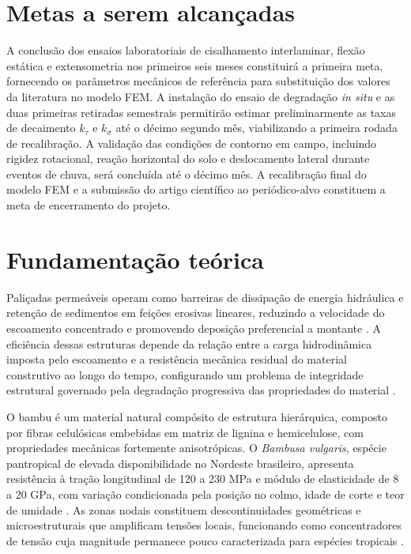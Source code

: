 \documentclass[
  brazilian,
  authoryear,
  preprint]{elsarticle}
\begin{document}
\section{Metas a serem alcançadas}\label{metas-a-serem-alcanuxe7adas}

A conclusão dos ensaios laboratoriais de cisalhamento interlaminar,
flexão estática e extensometria nos primeiros seis meses constituirá a
primeira meta, fornecendo os parâmetros mecânicos de referência para
substituição dos valores da literatura no modelo FEM. A instalação do
ensaio de degradação \emph{in situ} e as duas primeiras retiradas
semestrais permitirão estimar preliminarmente as taxas de decaimento
\(k_\tau\) e \(k_\sigma\) até o décimo segundo mês, viabilizando a
primeira rodada de recalibração. A validação das condições de contorno
em campo, incluindo rigidez rotacional, reação horizontal do solo e
deslocamento lateral durante eventos de chuva, será concluída até o
décimo mês. A recalibração final do modelo FEM e a submissão do artigo
científico ao periódico-alvo constituem a meta de encerramento do
projeto.

\section{Fundamentação teórica}\label{fundamentauxe7uxe3o-teuxf3rica}

Paliçadas permeáveis operam como barreiras de dissipação de energia
hidráulica e retenção de sedimentos em feições erosivas lineares,
reduzindo a velocidade do escoamento concentrado e promovendo deposição
preferencial a montante \citep{piton_et_al_2017, ramos_diez_et_al_2017}.
A eficiência dessas estruturas depende da relação entre a carga
hidrodinâmica imposta pelo escoamento e a resistência mecânica residual
do material construtivo ao longo do tempo, configurando um problema de
integridade estrutural governado pela degradação progressiva das
propriedades do material
\citep{bombino_et_al_2019, nichols_polyakov_2019}.

O bambu é um material natural compósito de estrutura hierárquica,
composto por fibras celulósicas embebidas em matriz de lignina e
hemicelulose, com propriedades mecânicas fortemente anisotrópicas. O
\emph{Bambusa vulgaris}, espécie pantropical de elevada disponibilidade
no Nordeste brasileiro, apresenta resistência à tração longitudinal de
120 a 230 MPa e módulo de elasticidade de 8 a 20 GPa, com variação
condicionada pela posição no colmo, idade de corte e teor de umidade
\citep{shah_et_al_2017, meng_et_al_2023}. As zonas nodais constituem
descontinuidades geométricas e microestruturais que amplificam tensões
locais, funcionando como concentradores de tensão cuja magnitude
permanece pouco caracterizada para espécies tropicais
\citep{budhe_et_al_2019}.
\end{document}
